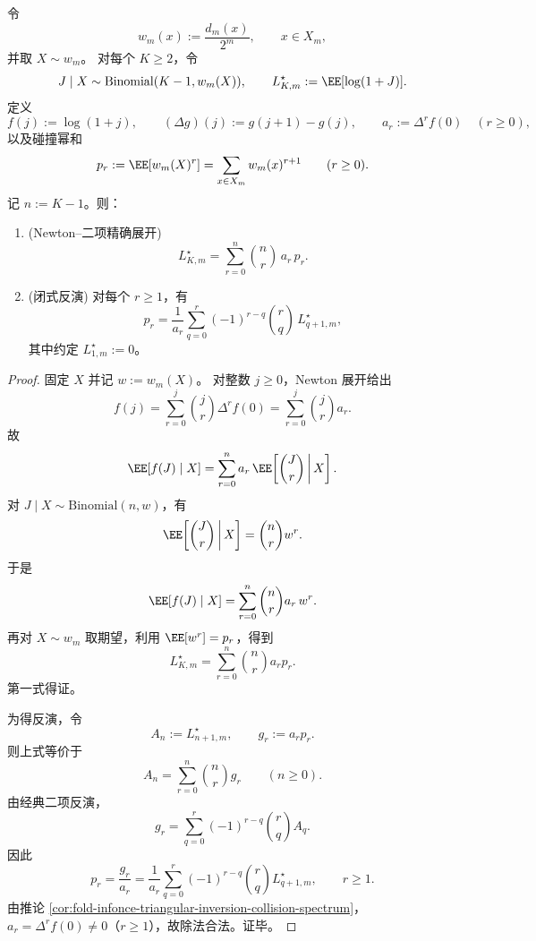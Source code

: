 \begin{theorem}\label{thm:xi-fold-bayes-infonce-newton-binomial-inversion}
令
\[
w_m(x):=\frac{d_m(x)}{2^m},\qquad x\in X_m,
\]
并取 \(X\sim w_m\)。
对每个 \(K\ge 2\)，令
\[
J\mid X\sim\mathrm{Binomial}(K-1,w_m(X)),
\qquad
L_{K,m}^{\star}:=\EE[\log(1+J)].
\]
定义
\[
f(j):=\log(1+j),\qquad (\Delta g)(j):=g(j+1)-g(j),\qquad
a_r:=\Delta^r f(0)\quad(r\ge 0),
\]
以及碰撞幂和
\[
p_r:=\EE[w_m(X)^r]=\sum_{x\in X_m}w_m(x)^{r+1}\qquad(r\ge 0).
\]
记 \(n:=K-1\)。则：
\begin{enumerate}
  \item \textnormal{(Newton--二项精确展开)}
  \[
  L_{K,m}^{\star}
  =\sum_{r=0}^{n}\binom{n}{r}\,a_r\,p_r.
  \]
  \item \textnormal{(闭式反演)} 对每个 \(r\ge 1\)，有
  \[
  p_r
  =\frac{1}{a_r}
  \sum_{q=0}^{r}(-1)^{r-q}\binom{r}{q}\,L_{q+1,m}^{\star},
  \]
  其中约定 \(L_{1,m}^{\star}:=0\)。
\end{enumerate}
\end{theorem}
\begin{proof}
固定 \(X\) 并记 \(w:=w_m(X)\)。
对整数 \(j\ge 0\)，Newton 展开给出
\[
f(j)=\sum_{r=0}^{j}\binom{j}{r}\Delta^r f(0)=\sum_{r=0}^{j}\binom{j}{r}a_r.
\]
故
\[
\EE[f(J)\mid X]
=\sum_{r=0}^{n}a_r\,\EE\!\left[\binom{J}{r}\,\middle|\,X\right].
\]
对 \(J\mid X\sim\mathrm{Binomial}(n,w)\)，有
\[
\EE\!\left[\binom{J}{r}\,\middle|\,X\right]=\binom{n}{r}w^r.
\]
于是
\[
\EE[f(J)\mid X]=\sum_{r=0}^{n}\binom{n}{r}a_r\,w^r.
\]
再对 \(X\sim w_m\) 取期望，利用 \(\EE[w^r]=p_r\)，得到
\[
L_{K,m}^{\star}=\sum_{r=0}^{n}\binom{n}{r}a_rp_r.
\]
第一式得证。
\par
为得反演，令
\[
A_n:=L_{n+1,m}^{\star},\qquad g_r:=a_rp_r.
\]
则上式等价于
\[
A_n=\sum_{r=0}^{n}\binom{n}{r}g_r\qquad(n\ge 0).
\]
由经典二项反演，
\[
g_r=\sum_{q=0}^{r}(-1)^{r-q}\binom{r}{q}A_q.
\]
因此
\[
p_r=\frac{g_r}{a_r}
=\frac{1}{a_r}\sum_{q=0}^{r}(-1)^{r-q}\binom{r}{q}L_{q+1,m}^{\star},
\qquad r\ge 1.
\]
由推论 \ref{cor:fold-infonce-triangular-inversion-collision-spectrum}，\(a_r=\Delta^r f(0)\neq 0\)（\(r\ge 1\)），故除法合法。证毕。
\end{proof}

